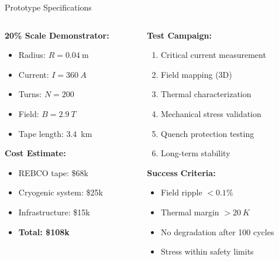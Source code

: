\documentclass[aspectratio=169,xcolor={table,dvipsnames}]{beamer}
\newcommand{\Tesla}[1]{#1~T}
\newcommand{\Ampere}[1]{#1~A}
\newcommand{\Kelvin}[1]{#1~K}
\begin{document}
\begin{frame}{Prototype Specifications}
    \begin{columns}
        \begin{column}{0.5\textwidth}
            \textbf{20\% Scale Demonstrator:}
            \begin{itemize}
                \item Radius: $R = 0.04~\text{m}$
                \item Current: $I = \Ampere{360}$
                \item Turns: $N = 200$
                \item Field: $B = \Tesla{2.9}$
                \item Tape length: 3.4~km
            \end{itemize}
            
            \vspace{0.3cm}
            \textbf{Cost Estimate:}
            \begin{itemize}
                \item REBCO tape: \$68k
                \item Cryogenic system: \$25k
                \item Infrastructure: \$15k
                \item \textbf{Total: \$108k}
            \end{itemize}
        \end{column}
        \begin{column}{0.5\textwidth}
            \textbf{Test Campaign:}
            \begin{enumerate}
                \item Critical current measurement
                \item Field mapping (3D)
                \item Thermal characterization
                \item Mechanical stress validation
                \item Quench protection testing
                \item Long-term stability
            \end{enumerate}
            
            \vspace{0.3cm}
            \textbf{Success Criteria:}
            \begin{itemize}
                \item Field ripple $< 0.1\%$
                \item Thermal margin $> \Kelvin{20}$
                \item No degradation after 100 cycles
                \item Stress within safety limits
            \end{itemize}
        \end{column}
    \end{columns}
\end{frame}
\end{document}
